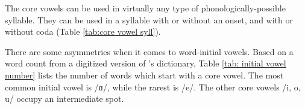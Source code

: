    
   
   The core vowels can be used in virtually any type of phonologically-possible syllable. They can be used in a syllable with or without an onset, and with or without coda (Table \ref{tab:core vowel syll}).
   
   \begin{table}[H]
   	\centering
   	\caption{Core vowels in different types of syllables}
   	\label{tab:core vowel syll}
   	\end{table}
   
   
   There are some asymmetries when it comes to word-initial vowels. Based on a word count from a digitized version of \citet{kouyoumdjian-1970-DictionaryArmenianEnglish}'s dictionary, Table \ref{tab: initial vowel number} lists the number of words which start with a core vowel. The most common initial vowel is /ɑ/, while the rarest is /e/. The other core vowels /i, o, u/ occupy an intermediate spot. 
   
